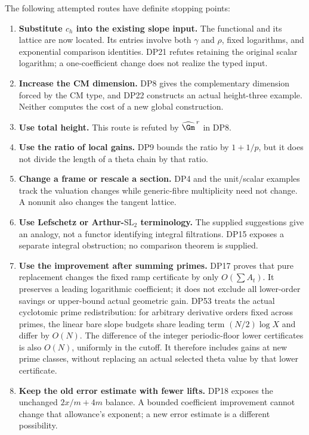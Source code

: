 \documentclass[11pt,a4paper]{article}
\theoremstyle{definition}\newtheorem{remark}[theorem]{Remark}
\begin{document}
The following attempted routes have definite stopping points:
\begin{enumerate}[leftmargin=*,label=\arabic*.]
\item \textbf{Substitute $c_h$ into the existing slope input.} The functional and its lattice are now located. Its entries involve both $\gamma$ and $\rho$, fixed logarithms, and exponential comparison identities. DP21 refutes retaining the original scalar logarithm; a one-coefficient change does not realize the typed input.
\item \textbf{Increase the CM dimension.} DP8 gives the complementary dimension forced by the CM type, and DP22 constructs an actual height-three example. Neither computes the cost of a new global construction.
\item \textbf{Use total height.} This route is refuted by $\widehat\Gm^{\,r}$ in DP8.
\item \textbf{Use the ratio of local gains.} DP9 bounds the ratio by $1+1/p$, but it does not divide the length of a theta chain by that ratio.
\item \textbf{Change a frame or rescale a section.} DP4 and the unit/scalar examples track the valuation changes while generic-fibre multiplicity need not change. A nonunit also changes the tangent lattice.
\item \textbf{Use Lefschetz or Arthur-$\mathrm{SL}_2$ terminology.} The supplied suggestions give an analogy, not a functor identifying integral filtrations. DP15 exposes a separate integral obstruction; no comparison theorem is supplied.
\item \textbf{Use the improvement after summing primes.} DP17 proves that pure replacement changes the fixed ramp certificate by only $O(\sum A_t)$. It preserves a leading logarithmic coefficient; it does not exclude all lower-order savings or upper-bound actual geometric gain. DP53 treats the actual cyclotomic prime redistribution: for arbitrary derivative orders fixed across primes, the linear bare slope budgets share leading term $(N/2)\log X$ and differ by $O(N)$. The difference of the integer periodic-floor lower certificates is also $O(N)$, uniformly in the cutoff. It therefore includes gains at new prime classes, without replacing an actual selected theta value by that lower certificate.
\item \textbf{Keep the old error estimate with fewer lifts.} DP18 exposes the unchanged $2x/m+4m$ balance. A bounded coefficient improvement cannot change that allowance's exponent; a new error estimate is a different possibility.

\end{enumerate}
\end{document}
